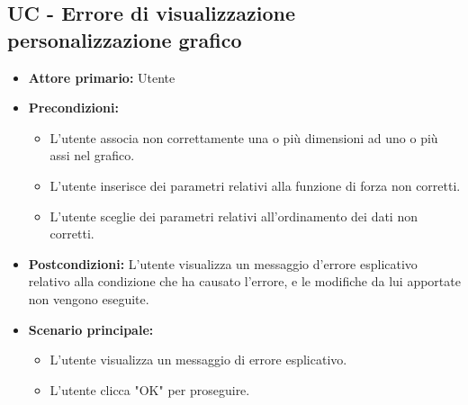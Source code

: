 \subsection{UC - Errore di visualizzazione personalizzazione grafico}
\label{sec:UC - Errore di personalizzazione}
\begin{itemize}
    \item \textbf{Attore primario:} Utente
    \item \textbf{Precondizioni:}
    		\begin{itemize} 
    			\item L'utente associa non correttamente una o più dimensioni ad uno o più assi nel grafico.
    			\item L'utente inserisce dei parametri relativi alla funzione di forza non corretti.
    			\item L'utente sceglie dei parametri relativi all'ordinamento dei dati non corretti.
    		\end{itemize}
    \item \textbf{Postcondizioni:} L'utente visualizza un messaggio d'errore esplicativo relativo alla condizione che ha causato l'errore, e le modifiche da lui apportate non vengono eseguite.
    \item \textbf{Scenario principale:}  
    \begin{itemize}
        \item L'utente visualizza un messaggio di errore esplicativo.
        \item L'utente clicca "OK" per proseguire.
    \end{itemize}
\end{itemize}